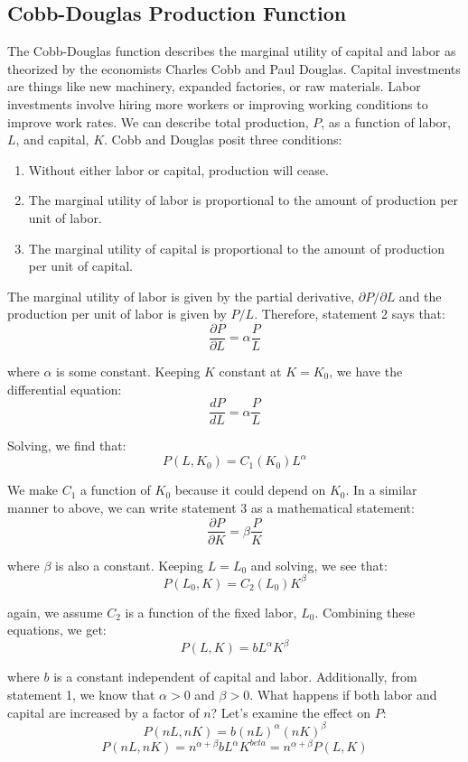\subsection{Cobb-Douglas Production Function}
The Cobb-Douglas function describes the marginal utility of capital and labor 
as theorized by the economists Charles Cobb and Paul Douglas. Capital 
investments are things like new machinery, expanded factories, or raw 
materials. Labor investments involve hiring more workers or improving 
working conditions to improve work rates. We can describe total production, 
$P$, as a function of labor, $L$, and capital, $K$. Cobb and Douglas posit 
three conditions:
\begin{enumerate}
\item Without either labor or capital, production will cease.
\item The marginal utility of labor is proportional to the amount of production 
per unit of labor.
\item The marginal utility of capital is proportional to the amount of 
production per unit of capital.
\end{enumerate}

The marginal utility of labor is given by the partial derivative, $\partial P 
/ \partial L$ and the production per unit of labor is given by $P / L$. 
Therefore, statement 2 says that:
$$\frac{\partial P}{\partial L} = \alpha \frac{P}{L}$$

where $\alpha$ is some constant. Keeping $K$ constant at $K = K_0$, we have 
the differential equation:
$$ \frac{d P}{d L} = \alpha \frac{P}{L}$$

Solving, we find that:
$$P(L, K_0) = C_1 \left( K_0 \right) L^{\alpha}$$

We make $C_1$ a function of $K_0$ because it could depend on $K_0$. In a 
similar manner to above, we can write statement 3 as a mathematical statement:
$$\frac{\partial P}{\partial K} = \beta \frac{P}{K}$$

where $\beta$ is also a constant. Keeping $L = L_0$ and solving, we see that:
$$P(L_0, K) = C_2(L_0)K^{\beta}$$

again, we assume $C_2$ is a function of the fixed labor, $L_0$. Combining 
these equations, we get:
$$P(L, K) = bL^{\alpha} K^{\beta}$$

where $b$ is a constant independent of capital and labor. Additionally, from 
statement 1, we know that $\alpha > 0$ and $\beta > 0$. What happens if both 
labor and capital are increased by a factor of $n$? Let's examine the effect 
on $P$:
$$P(nL, nK) = b \left( nL \right)^{\alpha} \left( nK \right)^{\beta}$$
$$P(nL, nK) = n^{\alpha + \beta} b L^{\alpha} K^{beta} = n^{\alpha + \beta} 
P(L, K)$$

